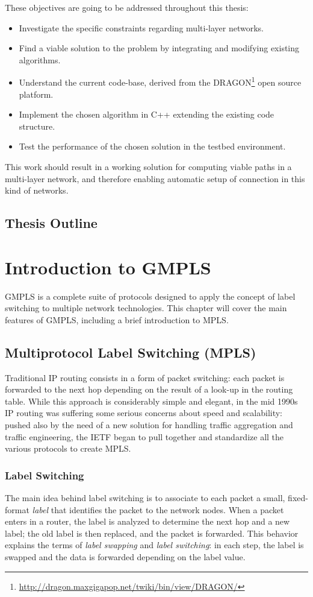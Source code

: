 \documentclass[10pt,a4paper]{report}
\begin{document}
These objectives are going to be addressed throughout this thesis:
\begin{itemize}
\item Investigate the specific constraints regarding multi-layer
  networks.
\item Find a viable solution to the problem by integrating and
  modifying existing algorithms.
\item Understand the current code-base, derived from the
  DRAGON\footnote{\url{http://dragon.maxgigapop.net/twiki/bin/view/DRAGON/}}
  open source platform.
\item Implement the chosen algorithm in C++ extending the existing
  code structure.
\item Test the performance of the chosen solution in the testbed
  environment.
\end{itemize}

This work should result in a working solution for computing viable
paths in a multi-layer network, and therefore enabling automatic setup
of connection in this kind of networks.

\section{Thesis Outline}

\chapter{Introduction to GMPLS}
GMPLS is a complete suite of protocols designed to apply the concept
of label switching to multiple network technologies. This chapter will
cover the main features of GMPLS, including a brief introduction to
MPLS.

\section{Multiprotocol Label Switching (MPLS)}
Traditional IP routing consists in a form of packet switching: each
packet is forwarded to the next hop depending on the result of a
look-up in the routing table. While this approach is considerably
simple and elegant, in the mid 1990s IP routing was suffering some
serious concerns about speed and scalability: pushed also by the need
of a new solution for handling traffic aggregation and traffic
engineering, the IETF began to pull together and standardize all the
various protocols to create MPLS.

\subsection{Label Switching}
The main idea behind label switching is to associate to each packet a
small, fixed-format \textit{label} that identifies the packet to the
network nodes. When a packet enters in a router, the label is analyzed
to determine the next hop and a new label; the old label is then
replaced, and the packet is forwarded. This behavior explains the
terms of \textit{label swapping} and \textit{label switching}: in each
step, the label is swapped and the data is forwarded depending on the
label value.
\end{document}
